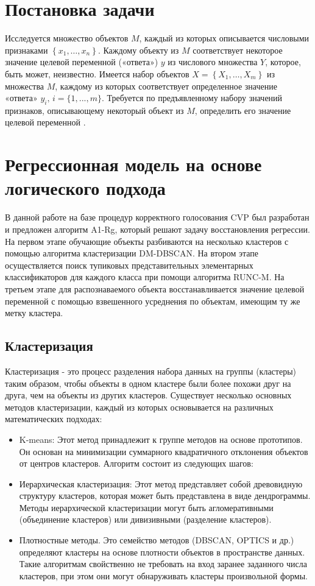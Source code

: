 \documentclass{article}
\begin{document}
\section{Постановка задачи}
Исследуется множество объектов $M$, каждый из которых описывается числовыми признаками $\left\{x_{1}, \ldots, x_{n}\right\}$. Каждому объекту из $M$ соответствует некоторое значение целевой переменной («ответа») $y$ из числового множества $Y$, которое, быть может, неизвестно. Имеется набор объектов $X=\left\{X_{1}, \ldots, X_{m}\right\}$ из множества $M$, каждому из которых соответствует определенное значение «ответа» $y_i\text{, } i=\{1,...,m\}$. Требуется по предъявленному набору значений признаков, описывающему некоторый объект из $M$, определить его значение целевой переменной \cite{author4_year}.

\section{Регрессионная модель на основе логического подхода}
В данной работе на базе процедур корректного голосования CVP был разработан и предложен алгоритм A1-Rg, который решают задачу восстановления регрессии. На первом этапе обучающие объекты разбиваются на несколько кластеров с помощью алгоритма кластеризации DM-DBSCAN. На втором этапе осуществляется поиск тупиковых представительных элементарных классификаторов для каждого класса при помощи алгоритма RUNC-M. На третьем этапе для распознаваемого объекта восстанавливается значение целевой переменной с помощью взвешенного усреднения по объектам, имеющим ту же метку кластера. 

\subsection{Кластеризация}
Кластеризация - это процесс разделения набора данных на группы (кластеры) таким образом, чтобы объекты в одном кластере были более похожи друг на друга, чем на объекты из других кластеров. Существует несколько основных методов кластеризации, каждый из которых основывается на различных математических подходах:
\begin{itemize}
    \item K-means: Этот метод принадлежит к группе методов на основе прототипов. Он основан на минимизации суммарного квадратичного отклонения объектов от центров кластеров. Алгоритм состоит из следующих шагов:
    \item Иерархическая кластеризация: Этот метод представляет собой древовидную структуру кластеров, которая может быть представлена в виде дендрограммы. Методы иерархической кластеризации могут быть агломеративными (объединение кластеров) или дивизивными (разделение кластеров). 
    \item Плотностные методы. Это семейство методов (DBSCAN, OPTICS и др.) определяют кластеры на основе плотности объектов в пространстве данных. Такие алгоритмам свойственно не требовать на вход заранее заданного числа кластеров, при этом они могут обнаруживать кластеры произвольной формы. 
\end{itemize}
\end{document}
